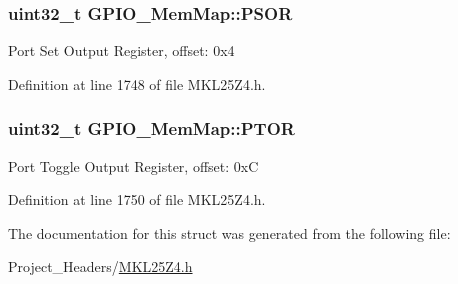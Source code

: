 \subsubsection[{\texorpdfstring{P\+S\+OR}{PSOR}}]{\setlength{\rightskip}{0pt plus 5cm}uint32\+\_\+t G\+P\+I\+O\+\_\+\+Mem\+Map\+::\+P\+S\+OR}\hypertarget{struct_g_p_i_o___mem_map_a14833f065ec123137ccce5ab873b5879}{}\label{struct_g_p_i_o___mem_map_a14833f065ec123137ccce5ab873b5879}
Port Set Output Register, offset\+: 0x4 

Definition at line 1748 of file M\+K\+L25\+Z4.\+h.

\subsubsection[{\texorpdfstring{P\+T\+OR}{PTOR}}]{\setlength{\rightskip}{0pt plus 5cm}uint32\+\_\+t G\+P\+I\+O\+\_\+\+Mem\+Map\+::\+P\+T\+OR}\hypertarget{struct_g_p_i_o___mem_map_a03faa882b5f4554ff4c11954c2d8759b}{}\label{struct_g_p_i_o___mem_map_a03faa882b5f4554ff4c11954c2d8759b}
Port Toggle Output Register, offset\+: 0xC 

Definition at line 1750 of file M\+K\+L25\+Z4.\+h.



The documentation for this struct was generated from the following file\+:\begin{DoxyCompactItemize}
\item 
Project\+\_\+\+Headers/\hyperlink{_m_k_l25_z4_8h}{M\+K\+L25\+Z4.\+h}\end{DoxyCompactItemize}
